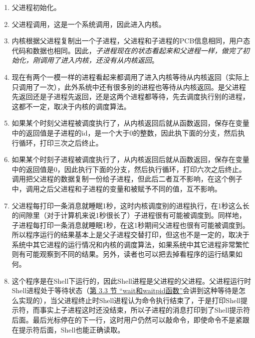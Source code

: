 \begin{enumerate}

\item 父进程初始化。

\item 父进程调用，这是一个系统调用，因此进入内核。

\item 内核根据父进程复制出一个子进程，父进程和子进程的PCB信息相同，用户态代码和数据也相同。因此，\emph{子进程现在的状态看起来和父进程一样，做完了初始化，刚调用了进入内核，还没有从内核返回}。

\item 现在有两个一模一样的进程看起来都调用了进入内核等待从内核返回（实际上只调用了一次），此外系统中还有很多别的进程也等待从内核返回。是父进程先返回还是子进程先返回，还是这两个进程都等待，先去调度执行别的进程，这都不一定，取决于内核的调度算法。

\item 如果某个时刻父进程被调度执行了，从内核返回后就从函数返回，保存在变量中的返回值是子进程的id，是一个大于0的整数，因此执下面的分支，然后执行循环，打印三次之后终止。

\item 如果某个时刻子进程被调度执行了，从内核返回后就从函数返回，保存在变量中的返回值是0，因此执行下面的分支，然后执行循环，打印六次之后终止。调用把父进程的数据复制一份给子进程，但此后二者互不影响，在这个例子中，调用之后父进程和子进程的变量和被赋予不同的值，互不影响。

\item 父进程每打印一条消息就睡眠1秒，这时内核调度别的进程执行，在1秒这么长的间隙里（对于计算机来说1秒很长了）子进程很有可能被调度到。同样地，子进程每打印一条消息就睡眠1秒，在这1秒期间父进程也很有可能被调度到。所以程序运行的结果基本上是父子进程交替打印，但这也不是一定的，取决于系统中其它进程的运行情况和内核的调度算法，如果系统中其它进程非常繁忙则有可能观察到不同的结果。另外，读者也可以把去掉看程序的运行结果如何。

\item 这个程序是在Shell下运行的，因此Shell进程是父进程的父进程。父进程运行时Shell进程处于等待状态（\hyperlink{db.ch30s03.id2867242}{第 3.\BookSplit{}3 节 “wait和waitpid函数”}会讲到这种等待是怎么实现的），当父进程终止时Shell进程认为命令执行结束了，于是打印Shell提示符，而事实上子进程这时还没结束，所以子进程的消息打印到了Shell提示符后面。最后光标停在的下一行，这时用户仍然可以敲命令，即使命令不是紧跟在提示符后面，Shell也能正确读取。
\end{enumerate}






